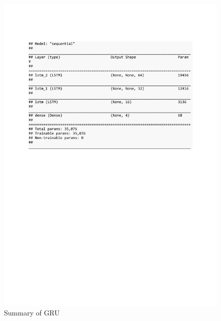 \begin{figure}[h]
	\centering
	\includegraphics[scale=0.5]{Figures/summary_LSTM_pred_house_temp}
	\decoRule
	\caption[Synthetic Anomalies]{Summary of GRU \parencite{own}}
	\label{fig:summary_GRU_pred_syn}
\end{figure}
